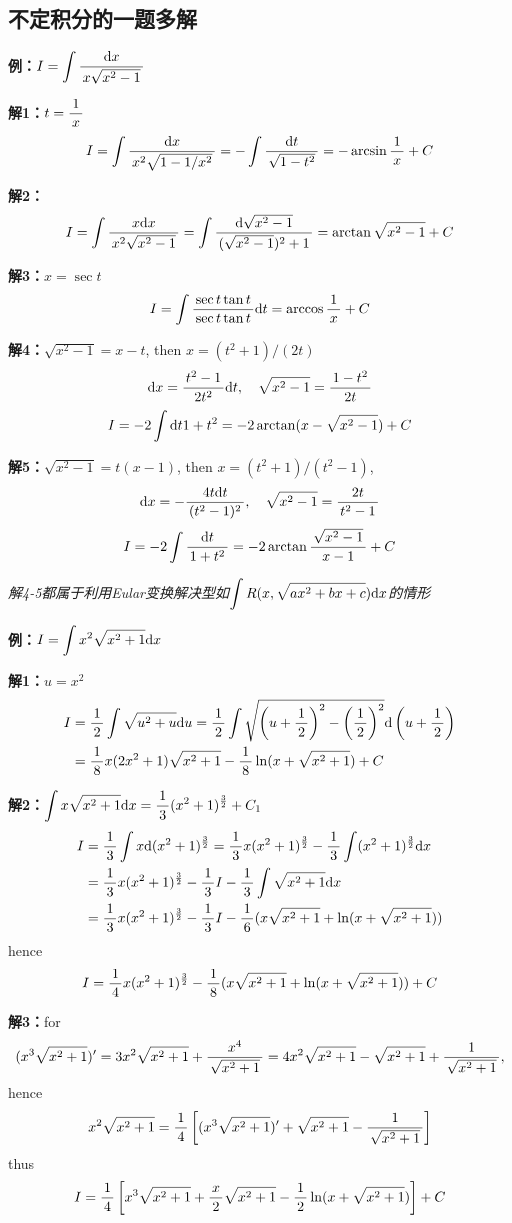 \begin{shaded}

\section*{不定积分的一题多解}

{\bf 例：}$I=\dint\df{\d x}{x\sqrt{x^2-1}}$

{\bf 解1：}$t=\df1x$
$$I=\dint\df{\d x}{x^2\sqrt{1-1/x^2}}=-\dint\df{\d t}{\sqrt{1-t^2}}
=-\arcsin\df1x+C$$

{\bf 解2：}
$$I=\dint\df{x\d x}{x^2\sqrt{x^2-1}}=\dint\df{\d\sqrt{x^2-1}}
{(\sqrt{x^2-1})^2+1}=\arctan\sqrt{x^2-1}+C$$

{\bf 解3：}$x=\sec t$
$$I=\dint\df{\sec t\tan t}{\sec t\tan t}\d t=\arccos\df1x+C$$

{\bf 解4：}$\sqrt{x^2-1}=x-t$, then $x=(t^2+1)/(2t)$
$$\d x=\df{t^2-1}{2t^2}\d t,\quad \sqrt{x^2-1}=\df{1-t^2}{2t}$$
$$I=-2\dint{\d t}{1+t^2}=-2\arctan(x-\sqrt{x^2-1})+C$$

{\bf 解5：}$\sqrt{x^2-1}=t(x-1)$, then $x=(t^2+1)/(t^2-1)$,
$$\d x=-\df{4t\d t}{(t^2-1)^2},\quad \sqrt{x^2-1}=\df{2t}{t^2-1}$$
$$I=-2\dint\df{\d t}{1+t^2}=-2\arctan\df{\sqrt{x^2-1}}{x-1}+C$$

{\it 解4-5都属于利用Eular变换解决型如$\dint R(x,\sqrt{ax^2+bx+c})\d x$的情形}

{\bf 例：}$I=\dint x^2\sqrt{x^2+1}\d x$

{\bf 解1：}$u=x^2$
\begin{align}
I&=\df12\dint\sqrt{u^2+u}\d u=\df12\dint\sqrt{\left(u+\df12\right)^2
-\left(\df12\right)^2}\d\left(u+\df12\right)\notag\\
&=\df18x(2x^2+1)\sqrt{x^2+1}-\df18\ln(x+\sqrt{x^2+1})+C\notag
\end{align}

{\bf 解2：}$\dint x\sqrt{x^2+1}\d x=\df13(x^2+1)^{\frac32}+C_1$
\begin{align}
I&=\df13\dint x\d(x^2+1)^{\frac32}=\df13 x(x^2+1)^{\frac32}
-\df13\dint(x^2+1)^{\frac32}\d x\notag\\
&=\df13x(x^2+1)^{\frac32}-\df13I-\df13\dint\sqrt{x^2+1}\d x\notag\\
&=\df13x(x^2+1)^{\frac32}-\df13I-\df16(x\sqrt{x^2+1}
+\ln(x+\sqrt{x^2+1}))\notag
\end{align}
hence
$$I=\df14x(x^2+1)^{\frac32}-\df18(x\sqrt{x^2+1}
+\ln(x+\sqrt{x^2+1}))+C$$

{\bf 解3：}for
$$(x^3\sqrt{x^2+1})'=3x^2\sqrt{x^2+1}+\df{x^4}{\sqrt{x^2+1}}
=4x^2\sqrt{x^2+1}-\sqrt{x^2+1}+\df1{\sqrt{x^2+1}},$$
hence
$$x^2\sqrt{x^2+1}=\df14\left[(x^3\sqrt{x^2+1})'+\sqrt{x^2+1}
-\df1{\sqrt{x^2+1}}\right]$$
thus
$$I=\df14\left[x^3\sqrt{x^2+1}+\df x2\sqrt{x^2+1}
-\df12\ln(x+\sqrt{x^2+1})\right]+C$$
\end{shaded}

